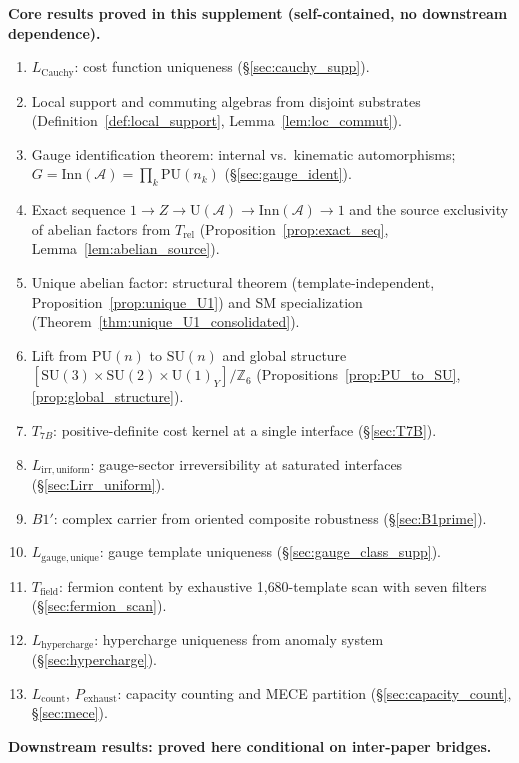 \documentclass[11pt,a4paper]{article}
\theoremstyle{definition}
\newcommand{\SU}{\mathrm{SU}}
\newcommand{\U}{\mathrm{U}}
\begin{document}
\begin{tcolorbox}[apfbox, title={What Is Assumed, What Is Proved, What Is Deferred}]
\smallskip\noindent\textbf{Core results proved in this supplement (self-contained, no downstream dependence).}
\begin{enumerate}[nosep,label=\arabic*.,leftmargin=2em]
  \item $L_{\mathrm{Cauchy}}$: cost function uniqueness (\S\ref{sec:cauchy_supp}).
  \item Local support and commuting algebras from disjoint substrates (Definition~\ref{def:local_support}, Lemma~\ref{lem:loc_commut}).
  \item Gauge identification theorem: internal vs.\ kinematic automorphisms; $G = \mathrm{Inn}(\mathcal{A}) = \prod_k \mathrm{PU}(n_k)$ (\S\ref{sec:gauge_ident}).
  \item Exact sequence $1 \to Z \to \mathrm{U}(\mathcal{A}) \to \mathrm{Inn}(\mathcal{A}) \to 1$ and the source exclusivity of abelian factors from $T_{\mathrm{rel}}$ (Proposition~\ref{prop:exact_seq}, Lemma~\ref{lem:abelian_source}).
  \item Unique abelian factor: structural theorem (template-independent, Proposition~\ref{prop:unique_U1}) and SM specialization (Theorem~\ref{thm:unique_U1_consolidated}).
  \item Lift from $\mathrm{PU}(n)$ to $\SU(n)$ and global structure $[\SU(3) \times \SU(2) \times \U(1)_Y]/\mathbb{Z}_6$ (Propositions~\ref{prop:PU_to_SU}, \ref{prop:global_structure}).
  \item $T_{7B}$: positive-definite cost kernel at a single interface (\S\ref{sec:T7B}).
  \item $L_{\mathrm{irr,uniform}}$: gauge-sector irreversibility at saturated interfaces (\S\ref{sec:Lirr_uniform}).
  \item $B1'$: complex carrier from oriented composite robustness (\S\ref{sec:B1prime}).
  \item $L_{\mathrm{gauge,unique}}$: gauge template uniqueness (\S\ref{sec:gauge_class_supp}).
  \item $T_{\mathrm{field}}$: fermion content by exhaustive 1{,}680-template scan with seven filters (\S\ref{sec:fermion_scan}).
  \item $L_{\mathrm{hypercharge}}$: hypercharge uniqueness from anomaly system (\S\ref{sec:hypercharge}).
  \item $L_{\mathrm{count}}$, $P_{\mathrm{exhaust}}$: capacity counting and MECE partition (\S\ref{sec:capacity_count}, \S\ref{sec:mece}).
\end{enumerate}

\smallskip\noindent\textbf{Downstream results: proved here conditional on inter-paper bridges.}


\end{tcolorbox}
\end{document}
